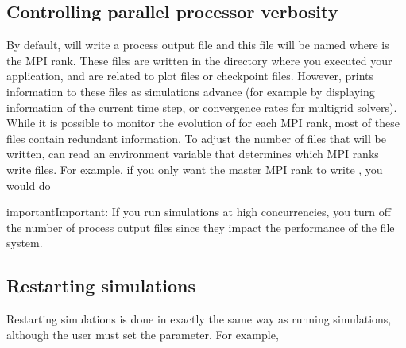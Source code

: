 \documentclass[letterpaper,10pt,english]{sphinxmanual}
\begin{document}
\subsection{Controlling parallel processor verbosity}
\label{\detokenize{Base/Control:controlling-parallel-processor-verbosity}}
By default,  will write a process output file  and this file will be named  where  is the MPI rank.
These files are written in the directory where you executed your application, and are  related to plot files or checkpoint files.
However,  prints information to these files as simulations advance (for example by displaying information of the current time step, or convergence rates for multigrid solvers).
While it is possible to monitor the evolution of  for each MPI rank, most of these files contain redundant information.
To adjust the number of files that will be written,  can read an environment variable  that determines which MPI ranks write  files.
For example, if you only want the master MPI rank to write , you would do

\begin{sphinxVerbatim}[commandchars=\\\{\},formatcom=\scriptsize]
 
\end{sphinxVerbatim}

\begin{sphinxadmonition}{important}{Important:}
If you run simulations at high concurrencies, you  turn off the number of process output files since they impact the performance of the file system.
\end{sphinxadmonition}


\subsection{Restarting simulations}
\label{\detokenize{Base/Control:restarting-simulations}}\label{\detokenize{Base/Control:chap-restartingsimulations}}
Restarting simulations is done in exactly the same way as running simulations, although the user must set the  parameter.
For example,
\end{document}
